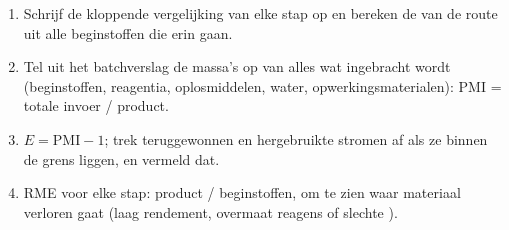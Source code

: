 \begin{method}\label{met:b3:green-industrial:metrics}
\begin{enumerate}
  \item Schrijf de kloppende vergelijking van elke stap op en bereken de
         van de route uit alle beginstoffen die erin gaan.
  \item Tel uit het batchverslag de massa's op van alles wat ingebracht
        wordt (beginstoffen, reagentia, oplosmiddelen, water,
        opwerkingsmaterialen): PMI = totale invoer / product.
  \item $E = \mathrm{PMI} - 1$; trek teruggewonnen en hergebruikte stromen af als ze binnen de
        grens liggen, en vermeld dat.
  \item RME voor elke stap: product / beginstoffen, om te zien waar
        materiaal verloren gaat (laag rendement, overmaat reagens of slechte
        ).
\end{enumerate}
\end{method}

